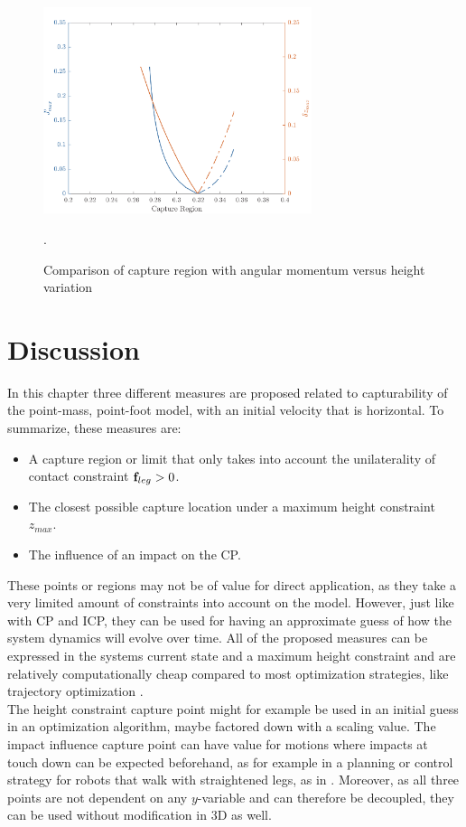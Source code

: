 \begin{figure}[h]
\centering
\includegraphics[width=0.7\textwidth]{STYLESTUFF/capcompare.png}
\caption{Comparison of capture region with angular momentum versus height variation}.
\label{fig:capcompare}
\end{figure}

\section{Discussion}
In this chapter three different measures are proposed related to capturability of the point-mass, point-foot model, with an initial velocity that is horizontal. To summarize, these measures are:
\begin{itemize}
	\item A capture region or limit that only takes into account the unilaterality of contact constraint $\mathbf{f}_{leg}>0$.
	\item The closest possible capture location under a maximum height constraint $z_{max}$.
	\item The influence of an impact on the \ac{CP}.
\end{itemize}
These points or regions may not be of value for direct application, as they take a very limited amount of constraints into account on the model. However, just like with \ac{CP} and \ac{ICP}, they can be used for having an approximate guess of how the system dynamics will evolve over time. All of the proposed measures can be expressed in the systems current state and a maximum height constraint and are relatively computationally cheap compared to most optimization strategies, like trajectory optimization \cite{kelly2017introduction}.\\
The height constraint capture point might for example be used in an initial guess in an optimization algorithm, maybe factored down with a scaling value. The impact influence capture point can have value for motions where impacts at touch down can be expected beforehand, as for example in a planning or control strategy for robots that walk with straightened legs, as in \cite{griffin2018straight}. Moreover, as all three points are not dependent on any $y$-variable and can therefore be decoupled, they can be used without modification in \ac{3D} as well.